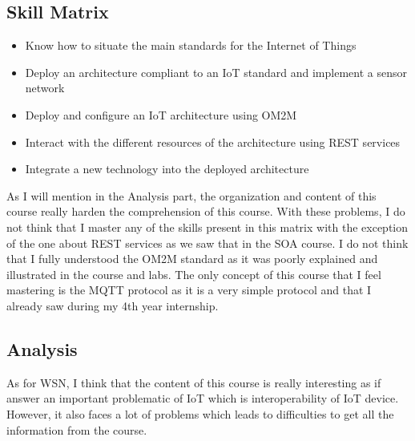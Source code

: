 \subsection{Skill Matrix}

\begin{itemize}
    \item Know how to situate the main standards for the Internet of Things
    \item Deploy an architecture compliant to an IoT standard and implement a sensor network
    \item Deploy and configure an IoT architecture using OM2M
    \item Interact with the different resources of the architecture using REST services
    \item Integrate a new technology into the deployed architecture
\end{itemize}

As I will mention in the Analysis part, the organization and content of this course really harden the comprehension of this course. With these problems, I do not think that I master any of the skills present in this matrix with the exception of the one about REST services as we saw that in the SOA course. I do not think that I fully understood the OM2M standard as it was poorly explained and illustrated in the course and labs. The only concept of this course that I feel mastering is the MQTT protocol as it is a very simple protocol and that I already saw during my 4th year internship.

\subsection{Analysis}

As for WSN, I think that the content of this course is really interesting as if answer an important problematic of IoT which is interoperability of IoT device. However, it also faces a lot of problems which leads to difficulties to get all the information from the course.
\\\par

